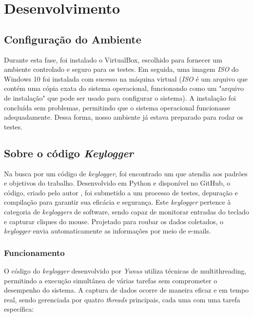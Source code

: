 \documentclass[12pt]{article}
\begin{document}
\section{Desenvolvimento}

\subsection{Configuração do Ambiente}

Durante esta fase, foi instalado o VirtualBox, escolhido para fornecer um ambiente controlado e seguro para os testes. Em seguida, uma imagem \textit{ISO} do Windows 10 foi instalada com sucesso na máquina virtual (\textit{ISO} é um arquivo que contém uma cópia exata do sistema operacional, funcionando como um "arquivo de instalação" que pode ser usado para configurar o sistema). A instalação foi concluída sem problemas, permitindo que o sistema operacional funcionasse adequadamente. Dessa forma, nosso ambiente já estava preparado para rodar os testes.

\subsection{Sobre o código \textit{Keylogger}}

Na busca por um código de \textit{keylogger}, foi encontrado um que atendia aos padrões e objetivos do trabalho. Desenvolvido em Python e disponível no GitHub, o código, criado pelo autor \citep{Aydinnyunus}, foi submetido a um processo de testes, depuração e compilação para garantir sua eficácia e segurança. Este \textit{keylogger} pertence à categoria de \textit{keyloggers} de software, sendo capaz de monitorar entradas do teclado e capturar cliques do mouse. Projetado para roubar os dados coletados, o \textit{keylogger} envia automaticamente as informações por meio de e-mails.

\subsubsection{Funcionamento}

O código do \textit{keylogger} desenvolvido por \textit{Yunus} utiliza técnicas de multithreading, permitindo a execução simultânea de várias tarefas sem comprometer o desempenho do sistema. A captura de dados ocorre de maneira eficaz e em tempo real, sendo gerenciada por quatro \textit{threads} principais, cada uma com uma tarefa específica:
\end{document}

